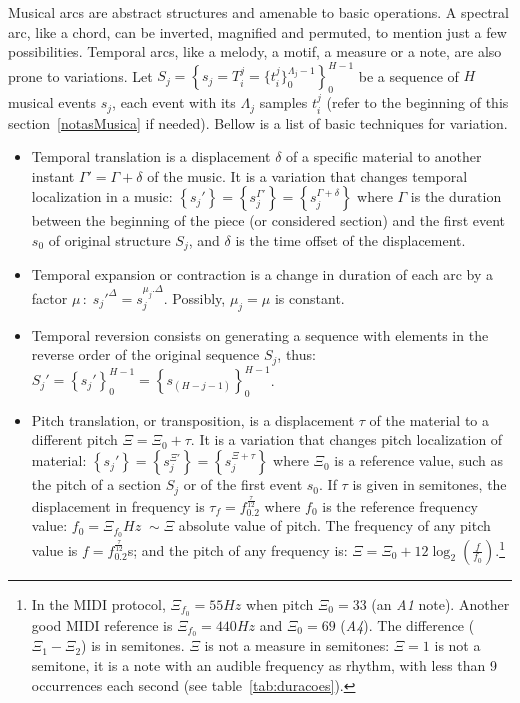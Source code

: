 Musical arcs are abstract structures and amenable to basic operations. A spectral arc, like a chord, can be inverted, magnified and permuted, to mention just a few possibilities. Temporal arcs, like a melody, a motif, a measure or a note, are also
prone to variations. Let
$S_j=\left\{s_j=T_i^j=\{t_i^{j}\}_0^{\Lambda_j-1}\right\}_0^{H-1}$ be a sequence
of $H$ musical events $s_j$, each event with its $\Lambda_j$ samples $t_i^j$
(refer to the beginning of this section~\ref{notasMusica} if needed). Bellow is a list of basic techniques
for variation.
\begin{itemize}
        \item Temporal translation is a displacement
    $\delta$ of a specific material to another instant $\Gamma'=\Gamma + \delta$
    of the music. It is a variation that changes temporal localization in
    a music:
    $\left\{s_j'\right\}=\left\{s_j^{\Gamma'}\right\}=\left\{s_j^{\Gamma+\delta}\right\}$
    where $\Gamma$ is the duration between the beginning of the piece (or considered
    section) and the first event $s_0$ of original structure $S_j$, and
    $\delta$ is the time offset of the displacement.

    \item Temporal expansion or contraction is a change in duration of each
    arc by a factor $\mu\,:\; s_j'^{\Delta}=s_j^{\mu_j . \Delta}$. Possibly,
    $\mu_j=\mu$ is constant.

    \item Temporal reversion consists on generating a sequence with elements
    in the reverse order of the original sequence $S_j$, thus: $S_j'=\left\{s_j'\right\}_0^{H-1}=\left\{s_{(H-j-1)}\right\}_0^{H-1}$.

    \item Pitch translation, or transposition, is a displacement $\tau$ of the material to a
        different pitch $\Xi=\Xi_0 + \tau$. It is a variation that changes pitch
        localization of material:
        $\left\{s_j'\right\}=\left\{s_j^{\Xi'}\right\}=\left\{s_j^{\Xi+\tau}\right\}$
        where $\Xi_0$ is a reference value, such as the pitch of a section $S_j$ or of the first event $s_0$.
        If $\tau$ is given in semitones, the displacement in
        frequency is $\tau_f=f_0.2^{\frac{\tau}{12}}$ where $f_0$ is the
        reference frequency value: $f_0=\Xi_{f_0}Hz\;\sim \Xi$ absolute value of pitch. The frequency of any pitch value is $f=f_0.2^{\frac{\tau}{12}}$s; 
        and the pitch of any frequency is: $\Xi=\Xi_0 +12
		\log_2\left(\frac{f}{f_0}\right)$.\footnote{In the MIDI protocol, $\Xi_{f_0}=55Hz$ when pitch $\Xi_0=33$
	(an \textit{A1} note). Another good MIDI reference is $\Xi_{f_0}=440Hz$ and
		$\Xi_0=69$ (\textit{A4}). The difference ($\Xi_1 - \Xi_2$) is in semitones.
        $\Xi$ is not a measure in semitones: $\Xi=1$ is not a semitone, it is a note with an audible frequency as rhythm, with
		less than 9 occurrences each second (see table~\ref{tab:duracoes}).}


\end{itemize}
